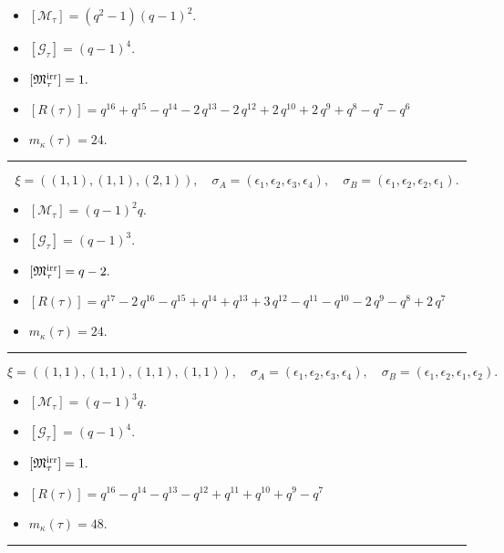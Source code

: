 \documentclass[10pt,a4paper]{amsart}
\begin{document}
\begin{itemize}
 \item $[\mathcal{M}_{\tau}] = {\left(q^{2} - 1\right)} {\left(q - 1\right)}^{2} .$

 \item $[\mathcal{G}_{\tau}] = {\left(q - 1\right)}^{4} .$

 \item $[{\frak M}_{\tau}^{\textrm{irr}}] = 1 .$

 \item $[R(\tau)] = q^{16} + q^{15} - q^{14} - 2 \, q^{13} - 2 \, q^{12} + 2 \, q^{10} + 2 \, q^{9} + q^{8} - q^{7} - q^{6} $

 \item $m_{\kappa}(\tau) = 24 .$

 \end{itemize}
\noindent\rule{8cm}{0.4pt}

$$\xi = ({(1, 1)}, {(1, 1)}, {(2, 1)}),\quad \sigma_A = ({{\epsilon_1}}, {{\epsilon_2}}, {{\epsilon_3, \epsilon_4}}),\quad \sigma_B = ({{\epsilon_1}}, {{\epsilon_2}}, {{\epsilon_2, \epsilon_1}}).$$

\begin{itemize}
 \item $[\mathcal{M}_{\tau}] = {\left(q - 1\right)}^{2} q .$

 \item $[\mathcal{G}_{\tau}] = {\left(q - 1\right)}^{3} .$

 \item $[{\frak M}_{\tau}^{\textrm{irr}}] = q - 2 .$

 \item $[R(\tau)] = q^{17} - 2 \, q^{16} - q^{15} + q^{14} + q^{13} + 3 \, q^{12} - q^{11} - q^{10} - 2 \, q^{9} - q^{8} + 2 \, q^{7} $

 \item $m_{\kappa}(\tau) = 24 .$

 \end{itemize}
\noindent\rule{8cm}{0.4pt}

$$\xi = ({(1, 1)}, {(1, 1)}, {(1, 1)}, {(1, 1)}),\quad \sigma_A = ({{\epsilon_1}}, {{\epsilon_2}}, {{\epsilon_3}}, {{\epsilon_4}}),\quad \sigma_B = ({{\epsilon_1}}, {{\epsilon_2}}, {{\epsilon_1}}, {{\epsilon_2}}).$$

\begin{itemize}
 \item $[\mathcal{M}_{\tau}] = {\left(q - 1\right)}^{3} q .$

 \item $[\mathcal{G}_{\tau}] = {\left(q - 1\right)}^{4} .$

 \item $[{\frak M}_{\tau}^{\textrm{irr}}] = 1 .$

 \item $[R(\tau)] = q^{16} - q^{14} - q^{13} - q^{12} + q^{11} + q^{10} + q^{9} - q^{7} $

 \item $m_{\kappa}(\tau) = 48 .$

 \end{itemize}
\noindent\rule{9cm}{2pt}\vspace{0.2cm}
\end{document}
